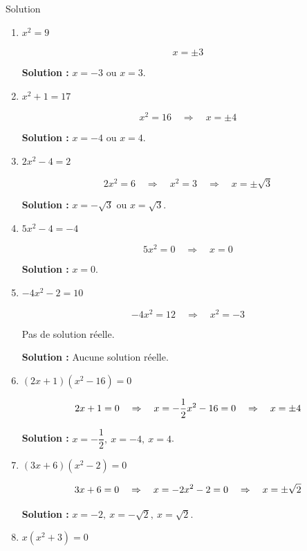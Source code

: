 \documentclass[a4paper,12pt]{article}
\begin{document}
\begin{solutionbox}{Solution}
\begin{enumerate}
    \item \( x^2 = 9 \)

    \[
    x = \pm 3
    \]

    \textbf{Solution :} \( x = -3 \) ou \( x = 3 \).

    \item \( x^2 + 1 = 17 \)

    \[
    x^2 = 16 \quad \Rightarrow \quad x = \pm 4
    \]

    \textbf{Solution :} \( x = -4 \) ou \( x = 4 \).

    \item \( 2x^2 - 4 = 2 \)

    \[
    2x^2 = 6 \quad \Rightarrow \quad x^2 = 3 \quad \Rightarrow \quad x = \pm \sqrt{3}
    \]

    \textbf{Solution :} \( x = -\sqrt{3} \) ou \( x = \sqrt{3} \).

    \item \( 5x^2 - 4 = -4 \)

    \[
    5x^2 = 0 \quad \Rightarrow \quad x = 0
    \]

    \textbf{Solution :} \( x = 0 \).

    \item \( -4x^2 - 2 = 10 \)

    \[
    -4x^2 = 12 \quad \Rightarrow \quad x^2 = -3
    \]

    Pas de solution réelle.

    \textbf{Solution :} Aucune solution réelle.

    \item \( (2x + 1)(x^2 - 16) = 0 \)

    \[
    2x + 1 = 0 \quad \Rightarrow \quad x = -\dfrac{1}{2} \\
    x^2 - 16 = 0 \quad \Rightarrow \quad x = \pm 4
    \]

    \textbf{Solution :} \( x = -\dfrac{1}{2},\ x = -4,\ x = 4 \).

    \item \( (3x + 6)(x^2 - 2) = 0 \)

    \[
    3x + 6 = 0 \quad \Rightarrow \quad x = -2 \\
    x^2 - 2 = 0 \quad \Rightarrow \quad x = \pm \sqrt{2}
    \]

    \textbf{Solution :} \( x = -2,\ x = -\sqrt{2},\ x = \sqrt{2} \).

    \item \( x(x^2 + 3) = 0 \)


\end{enumerate}
\end{solutionbox}
\end{document}
